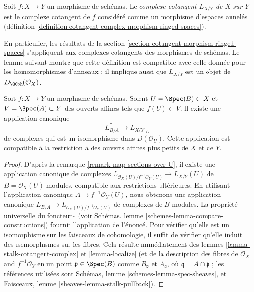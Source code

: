 \begin{definition}
\label{definition-cotangent-morphism-schemes}
Soit $f : X \to Y$ un morphisme de schémas. Le {\it complexe cotangent
$L_{X/Y}$ de $X$ sur $Y$} est le complexe cotangent de $f$ considéré comme un
morphisme d'espaces annelés (définition
\ref{definition-cotangent-complex-morphism-ringed-spaces}).
\end{definition}

\noindent
En particulier, les résultats de la section
\ref{section-cotangent-morphism-ringed-spaces} s'appliquent aux complexes
cotangents des morphismes de schémas. Le lemme suivant montre que cette
définition est compatible avec celle donnée pour les homomorphismes d'anneaux ;
il implique aussi que $L_{X/Y}$ est un objet de $D_\QCoh(\mathcal{O}_X)$.

\begin{lemma}
\label{lemma-morphism-affine-schemes}
Soit $f : X \to Y$ un morphisme de schémas. Soient
$U = \Spec(B) \subset X$ et $V = \Spec(A) \subset Y$ des ouverts affines tels
que $f(U) \subset V$. Il existe une application canonique
$$
\widetilde{L_{B/A}} \longrightarrow L_{X/Y}|_U
$$
de complexes qui est un isomorphisme dans $D(\mathcal{O}_U)$. Cette application
est compatible à la restriction à des ouverts affines plus petits de $X$ et
de $Y$.
\end{lemma}

\begin{proof}
D'après la remarque \ref{remark-map-sections-over-U}, il existe une
application canonique de complexes
$L_{\mathcal{O}_X(U)/f^{-1}\mathcal{O}_Y(U)} \to L_{X/Y}(U)$
de $B = \mathcal{O}_X(U)$-modules, compatible aux restrictions ultérieures. En
utilisant l'application canonique $A \to f^{-1}\mathcal{O}_Y(U)$, nous
obtenons une application canonique
$L_{B/A} \to L_{\mathcal{O}_X(U)/f^{-1}\mathcal{O}_Y(U)}$
de complexes de $B$-modules. La propriété universelle du foncteur
$\widetilde{\ }$ (voir Schémas, lemme
\ref{schemes-lemma-compare-constructions}) fournit l'application de l'énoncé.
Pour vérifier qu'elle est un isomorphisme sur les faisceaux de cohomologie, il
suffit de vérifier qu'elle induit des isomorphismes sur les fibres. Cela
résulte immédiatement des lemmes \ref{lemma-stalk-cotangent-complex} et
\ref{lemma-localize} (et de la description des fibres de
$\mathcal{O}_X$ and $f^{-1}\mathcal{O}_Y$
en un point $\mathfrak p \in \Spec(B)$ comme $B_\mathfrak p$ et
$A_\mathfrak q$, où $\mathfrak q = A \cap \mathfrak p$ ; les références
utilisées sont Schémas, lemme \ref{schemes-lemma-spec-sheaves}, et Faisceaux,
lemme \ref{sheaves-lemma-stalk-pullback}).
\end{proof}

